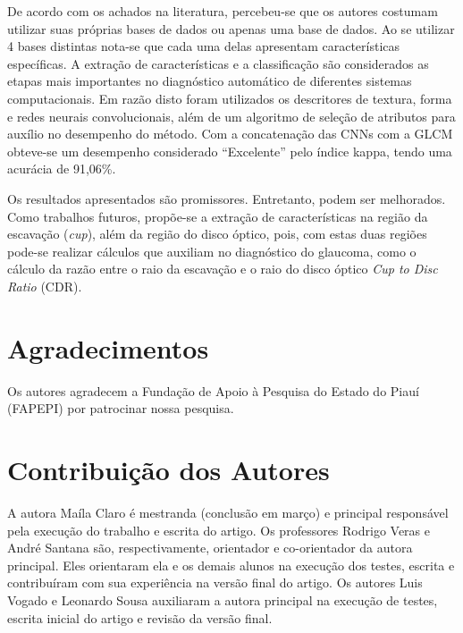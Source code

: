 \documentclass[fleqn,10pt]{SelfArx} %
\begin{document}
De acordo com os achados na literatura, percebeu-se que os autores costumam utilizar suas próprias bases de dados ou apenas uma base de dados. Ao se utilizar 4 bases distintas nota-se que cada uma delas apresentam características específicas. A extração de características e a classificação são considerados as etapas mais importantes no diagnóstico automático de diferentes sistemas computacionais. Em razão disto foram utilizados os descritores de textura, forma e redes neurais convolucionais, além de um algoritmo de seleção de atributos para auxílio no desempenho do método. Com a concatenação das CNNs com a GLCM obteve-se um desempenho considerado ``Excelente'' pelo índice kappa, tendo uma acurácia de 91,06\%. 

Os resultados apresentados são promissores. Entretanto, podem ser melhorados. Como trabalhos futuros, propõe-se a extração de características na região da escavação (\textit{cup}), além da região do disco óptico, pois, com estas duas regiões pode-se realizar cálculos que auxiliam no diagnóstico do glaucoma, como o cálculo da razão entre o raio da escavação e o raio do disco óptico \textit{Cup to Disc Ratio} (CDR).

\section*{Agradecimentos}
Os autores agradecem a Fundação de Apoio à Pesquisa do Estado do Piauí (FAPEPI) por patrocinar nossa pesquisa.

\section*{Contribuição dos Autores}
A autora Maíla Claro é mestranda (conclusão em março) e principal responsável pela execução do trabalho e escrita do artigo. Os professores Rodrigo Veras e André Santana são, respectivamente, orientador e co-orientador da autora principal. Eles orientaram ela e os demais alunos na execução dos testes, escrita e contribuíram com sua experiência na versão final do artigo. Os autores Luis Vogado e Leonardo Sousa auxiliaram a autora principal na execução de testes, escrita inicial do artigo e revisão da versão final.


\balance

\makeatletter
\renewcommand\@biblabel[1]{{\parbox{0.7cm}{[#1]}}}
\makeatother
\renewcommand{\refname}{Referências}



\balance
\end{document}
